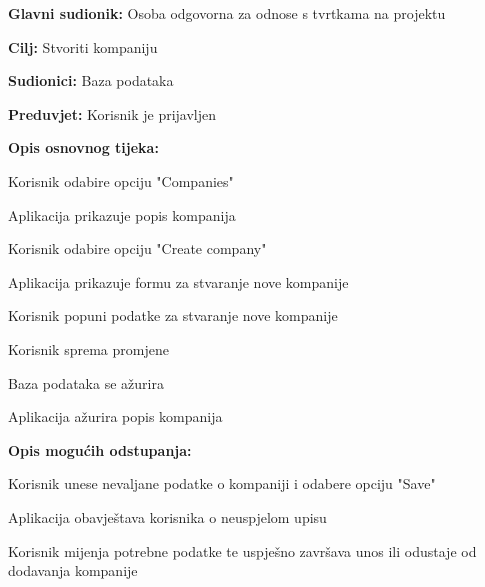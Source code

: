 					\noindent {}
					\begin{packed_item}

						\item \textbf{Glavni sudionik:} Osoba odgovorna za odnose s tvrtkama na projektu
						\item \textbf{Cilj:} Stvoriti kompaniju
						\item \textbf{Sudionici:} Baza podataka
						\item \textbf{Preduvjet:} Korisnik je prijavljen
						\item \textbf{Opis osnovnog tijeka:}

						\item[] \begin{packed_enum}

							\item Korisnik odabire opciju "Companies"
							\item Aplikacija prikazuje popis kompanija
							\item Korisnik odabire opciju "Create company"
							\item Aplikacija prikazuje formu za stvaranje nove kompanije
							\item Korisnik popuni podatke za stvaranje nove kompanije
							\item Korisnik sprema promjene
							\item Baza podataka se ažurira
							\item Aplikacija ažurira popis kompanija

						\end{packed_enum}

						\item \textbf{Opis mogućih odstupanja:}

						\item[] \begin{packed_item}

							\item[7.b] Korisnik unese nevaljane podatke o kompaniji i odabere opciju "Save"
							\item[] \begin{packed_enum}

								\item Aplikacija obavještava korisnika o neuspjelom upisu
								\item Korisnik mijenja potrebne podatke te uspješno završava unos ili odustaje od dodavanja kompanije

							\end{packed_enum}

						\end{packed_item}
					\end{packed_item}

